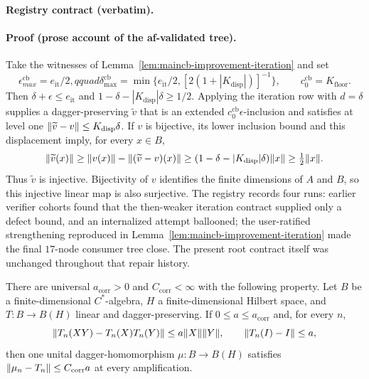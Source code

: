\noindent\textbf{Registry contract (verbatim).}

\paragraph{Proof (prose account of the af-validated tree).}
Take the witnesses of Lemma~\ref{lem:maincb-improvement-iteration} and set
\[
 \epsilon_{max}^{\mathrm{cb}}=e_{\mathrm{it}}/2,qquad
 \delta_{\max}^{\mathrm{cb}}=\min\{e_{\mathrm{it}}/2,[2(1+|K_{\mathrm{disp}}|)]^{-1}\},
 \qquad c_{0}^{\mathrm{cb}}=K_{\mathrm{floor}}.
\]
Then $\delta+\epsilon\le e_{\mathrm{it}}$ and
$1-\delta-|K_{\mathrm{disp}}|\delta\ge1/2$.  Applying the iteration row with
$d=\delta$ supplies a dagger-preserving $\widetilde v$ that is an extended
$c_{0}^{\mathrm{cb}}\epsilon$-inclusion and satisfies at level one
$\lVert \widetilde v-v\rVert\le K_{\mathrm{disp}}\delta$.  If $v$ is bijective, its
lower inclusion bound and this displacement imply, for every $x\in B$,
\[
 \lVert \widetilde v(x)\rVert\ge
 \lVert v(x)\rVert-\lVert (\widetilde v-v)(x)\rVert
 \ge(1-\delta-|K_{\mathrm{disp}}|\delta)\lVert x\rVert
 \ge\tfrac12\lVert x\rVert.
\]
Thus $\widetilde v$ is injective.  Bijectivity of $v$ identifies the finite
dimensions of $A$ and $B$, so this injective linear map is also surjective.
The registry records four runs: earlier verifier cohorts found that the then-weaker
iteration contract supplied only a defect bound, and an internalized attempt ballooned;
the user-ratified strengthening reproduced in Lemma~\ref{lem:maincb-improvement-iteration}
made the final $17$-node consumer tree close.  The present root contract itself was
unchanged throughout that repair history.

\begin{lemma}\label{lem:extcb-exact-target-correction}
There are universal $a_{\mathrm{corr}}>0$ and $C_{\mathrm{corr}}<\infty$ with
the following property.  Let $B$ be a finite-dimensional $C^{*}$-algebra,
$H$ a finite-dimensional Hilbert space, and $T:B\to B(H)$ linear and
dagger-preserving.  If $0\le a\le a_{\mathrm{corr}}$ and, for every $n$,
\[
 \lVert T_n(XY)-T_n(X)T_n(Y)\rVert\le a\lVert X\rVert\lVert Y\rVert,
 \qquad \lVert T_n(I)-I\rVert\le a,
\]
then one unital dagger-homomorphism $\mu:B\to B(H)$ satisfies
$\lVert \mu_n-T_n\rVert\le C_{\mathrm{corr}}a$ at every amplification.
\end{lemma}

